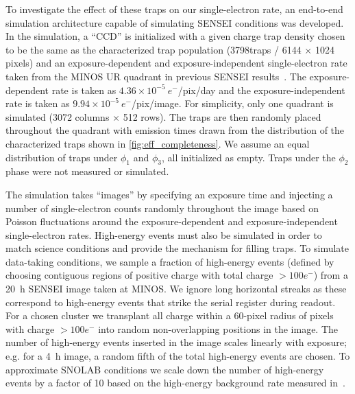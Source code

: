 \documentclass[aps, prapplied,twocolumn,showpacs,superscriptaddress,preprintnumbers, longbibliography,nofootinbib,floatfix]{revtex4-2}
\newcommand{\ntraps}{3798}
\begin{document}
To investigate the effect of these traps on our single-electron rate, an end-to-end simulation architecture capable of simulating SENSEI conditions was developed. 
In the simulation, a ``CCD'' is initialized with a given charge trap density chosen to be the same as the characterized trap population (\ntraps\;traps / 6144 $\times$ 1024 pixels) and an exposure-dependent and exposure-independent single-electron rate taken from the MINOS UR quadrant in previous SENSEI results~\cite{SENSEI:2024yyt}. 
The exposure-dependent rate is taken as $4.36\times10^{-5}~e^-$/pix/day and the exposure-independent rate is taken as $9.94\times10^{-5}~e^-$/pix/image. 
For simplicity, only one quadrant is simulated (3072 columns $\times$ 512 rows). 
The traps are then randomly placed throughout the quadrant with emission times drawn from the distribution of the characterized traps shown in \cref{fig:eff_completeness}. 
We assume an equal distribution of traps under $\phi_1$ and $\phi_3$, all initialized as empty. Traps under the $\phi_2$ phase were not measured or simulated. %

The simulation takes ``images'' by specifying an exposure time and injecting a number of single-electron counts randomly throughout the image based on Poisson fluctuations around the exposure-dependent and exposure-independent single-electron rates. 
High-energy events must also be simulated in order to match science conditions and provide the mechanism for filling traps. 
To simulate data-taking conditions, we sample a fraction of high-energy events (defined by choosing contiguous regions of positive charge with total charge $>100e^-$) from a 20~h SENSEI image taken at MINOS. 
We ignore long horizontal streaks as these correspond to high-energy events that strike the serial register during readout. 
For a chosen cluster we transplant all charge within a 60-pixel radius of pixels with charge $>100e^-$ into random non-overlapping positions in the image. 
The number of high-energy events inserted in the image scales linearly with exposure; e.g. for a 4~h image, a random fifth of the total high-energy events are chosen. 
To approximate SNOLAB conditions we scale down the number of high-energy events by a factor of 10 based on the high-energy background rate measured in~\cite{SENSEI:2024yyt}. 
\end{document}

